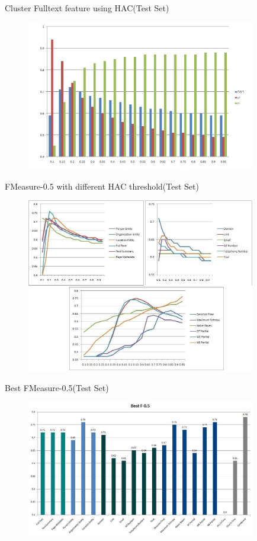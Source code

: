 \documentclass{beamer}
\begin{document}
\begin{frame}[plain]{Cluster Fulltext feature using HAC(Test Set)}
\begin{figure}
\includegraphics[width=100mm]{agglo}
\end{figure}
\end{frame}

\begin{frame}[plain]{FMeasure-0.5 with different HAC threshold(Test Set)}
\begin{figure}
\includegraphics[width=100mm]{trend}
\end{figure}
\end{frame}

\begin{frame}[plain]{Best FMeasure-0.5(Test Set)}
\begin{figure}
\includegraphics[width=100mm]{best}
\end{figure}
\end{frame}
\end{document}
